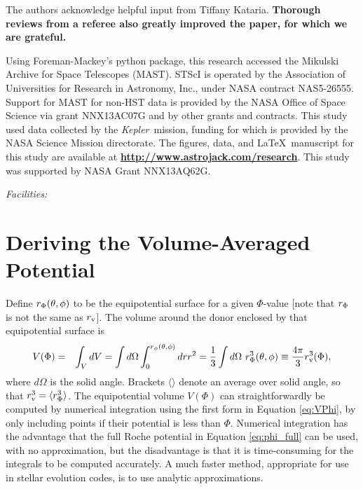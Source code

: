 \documentclass{aastex}
\newcommand{\be}{\begin{eqnarray}}
\newcommand{\ee}{\end{eqnarray}}
\newcommand{\rv}{r_{\rm v}}
\newcommand{\kepler}{{\it Kepler}}
\begin{document}
\acknowledgments
The authors acknowledge helpful input from Tiffany Kataria. {\bf Thorough reviews from a referee also greatly improved the paper, for which we are grateful.}

Using Foreman-Mackey's  python package, this research accessed the Mikulski Archive for Space Telescopes (MAST). STScI is operated by the Association of Universities for Research in Astronomy, Inc., under NASA contract NAS5-26555. Support for MAST for non-HST data is provided by the NASA Office of Space Science via grant NNX13AC07G and by other grants and contracts. This study used data collected by the \kepler\ mission, funding for which is provided by the NASA Science Mission directorate. The figures, data, and \LaTeX\ manuscript for this study are available at {\bf \url{http://www.astrojack.com/research}}. This study was supported by NASA Grant NNX13AQ62G.

{\it Facilities:} \facility{\kepler}

\appendix
\section{Deriving the Volume-Averaged Potential}
\label{apx:potential}
Define $r_{\rm \Phi}(\theta, \phi)$ to be the equipotential surface for a given $\Phi$-value [note that $r_{\rm \Phi}$ is not the same as $\rv$]. The volume around the donor enclosed by that equipotential surface is
\be
V(\Phi) & = & \int_{V}  dV = \int d\Omega \int_0^{r_\phi(\theta,\phi)} dr r^2 =  \frac{1}{3} \int d\Omega\ r_\Phi^3(\theta,\phi) \equiv \frac{4\pi}{3} \rv^3(\Phi),
\label{eq:VPhi}
\ee
where $d\Omega$ is the solid angle. Brackets $\langle \rangle$ denote an average over solid angle, so that
$r_{\rm v}^3 = \langle r_\Phi^3 \rangle$. The equipotential volume $V(\Phi)$ can straightforwardly be computed by numerical integration using the first form in Equation \ref{eq:VPhi}, by only including points if their potential is less than $\Phi$. Numerical integration has the advantage that the full Roche potential in Equation \ref{eq:phi_full} can be used, with no approximation, but the disadvantage is that it is time-consuming for the integrals to be computed accurately. A much faster method, appropriate for use in stellar evolution codes, is to use analytic approximations. 
\end{document}
